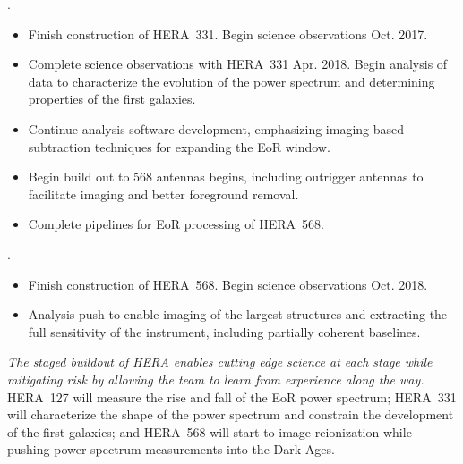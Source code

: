 \documentclass[preprint]{aastex}
\begin{document}
\vspace{-7pt}
.
\begin{itemize}\setlength{\parskip}{0pt}\itemsep0pt
\vspace{-7pt}
  \item Finish construction of HERA~331. Begin science observations Oct. 2017.
  \item Complete science observations with HERA~331 Apr. 2018. Begin analysis of data to
characterize the evolution of the power spectrum and determining properties of the first galaxies.
  \item Continue analysis software development, emphasizing imaging-based subtraction techniques for expanding the EoR window.
  \item Begin build out to 568 antennas begins, including outrigger antennas to facilitate imaging and better foreground removal.
  \item Complete pipelines for EoR processing of HERA~568.
\end{itemize}

\vspace{-7pt}
.
\begin{itemize}\setlength{\parskip}{0pt}\itemsep0pt
\vspace{-7pt}
  \item Finish construction of HERA~568. Begin science observations Oct. 2018.
  \item Analysis push to enable imaging of the largest structures and extracting the full sensitivity of 
the instrument, including partially coherent baselines. 
\end{itemize}

\noindent
{\it The staged buildout of HERA enables cutting edge science at each stage while
mitigating risk by allowing the team to learn from experience along the way.}
HERA~127 will measure the rise and fall of the EoR power spectrum; HERA~331
will characterize the shape of the power spectrum and constrain the development
of the first galaxies; and HERA~568 will start to image reionization while
pushing power spectrum measurements into the Dark Ages.
\end{document}
